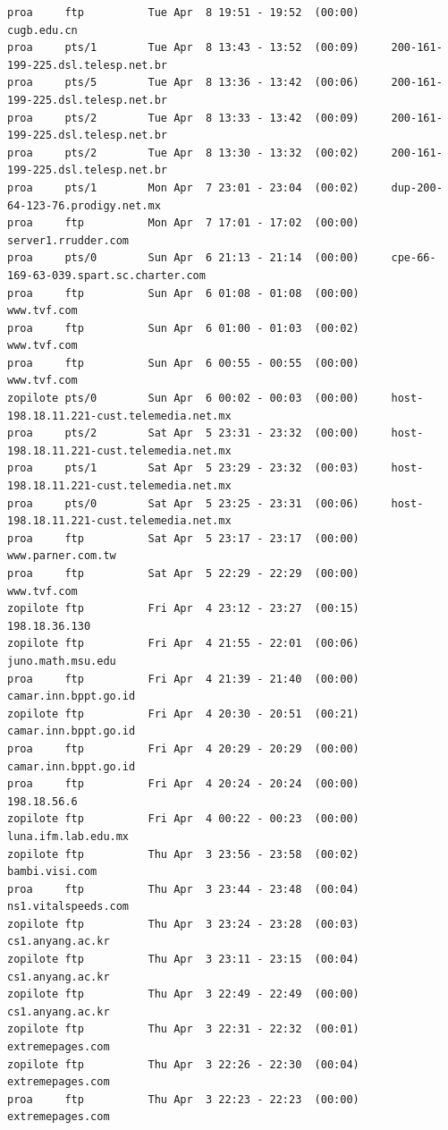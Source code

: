\begin{lstlisting}[style=terminal]
proa     ftp          Tue Apr  8 19:51 - 19:52  (00:00)     cugb.edu.cn
proa     pts/1        Tue Apr  8 13:43 - 13:52  (00:09)     200-161-199-225.dsl.telesp.net.br
proa     pts/5        Tue Apr  8 13:36 - 13:42  (00:06)     200-161-199-225.dsl.telesp.net.br
proa     pts/2        Tue Apr  8 13:33 - 13:42  (00:09)     200-161-199-225.dsl.telesp.net.br
proa     pts/2        Tue Apr  8 13:30 - 13:32  (00:02)     200-161-199-225.dsl.telesp.net.br
proa     pts/1        Mon Apr  7 23:01 - 23:04  (00:02)     dup-200-64-123-76.prodigy.net.mx
proa     ftp          Mon Apr  7 17:01 - 17:02  (00:00)     server1.rrudder.com
proa     pts/0        Sun Apr  6 21:13 - 21:14  (00:00)     cpe-66-169-63-039.spart.sc.charter.com
proa     ftp          Sun Apr  6 01:08 - 01:08  (00:00)     www.tvf.com
proa     ftp          Sun Apr  6 01:00 - 01:03  (00:02)     www.tvf.com
proa     ftp          Sun Apr  6 00:55 - 00:55  (00:00)     www.tvf.com
zopilote pts/0        Sun Apr  6 00:02 - 00:03  (00:00)     host-198.18.11.221-cust.telemedia.net.mx
proa     pts/2        Sat Apr  5 23:31 - 23:32  (00:00)     host-198.18.11.221-cust.telemedia.net.mx
proa     pts/1        Sat Apr  5 23:29 - 23:32  (00:03)     host-198.18.11.221-cust.telemedia.net.mx
proa     pts/0        Sat Apr  5 23:25 - 23:31  (00:06)     host-198.18.11.221-cust.telemedia.net.mx
proa     ftp          Sat Apr  5 23:17 - 23:17  (00:00)     www.parner.com.tw
proa     ftp          Sat Apr  5 22:29 - 22:29  (00:00)     www.tvf.com
zopilote ftp          Fri Apr  4 23:12 - 23:27  (00:15)     198.18.36.130
zopilote ftp          Fri Apr  4 21:55 - 22:01  (00:06)     juno.math.msu.edu
proa     ftp          Fri Apr  4 21:39 - 21:40  (00:00)     camar.inn.bppt.go.id
zopilote ftp          Fri Apr  4 20:30 - 20:51  (00:21)     camar.inn.bppt.go.id
proa     ftp          Fri Apr  4 20:29 - 20:29  (00:00)     camar.inn.bppt.go.id
proa     ftp          Fri Apr  4 20:24 - 20:24  (00:00)     198.18.56.6
zopilote ftp          Fri Apr  4 00:22 - 00:23  (00:00)     luna.ifm.lab.edu.mx
zopilote ftp          Thu Apr  3 23:56 - 23:58  (00:02)     bambi.visi.com
proa     ftp          Thu Apr  3 23:44 - 23:48  (00:04)     ns1.vitalspeeds.com
zopilote ftp          Thu Apr  3 23:24 - 23:28  (00:03)     cs1.anyang.ac.kr
zopilote ftp          Thu Apr  3 23:11 - 23:15  (00:04)     cs1.anyang.ac.kr
zopilote ftp          Thu Apr  3 22:49 - 22:49  (00:00)     cs1.anyang.ac.kr
zopilote ftp          Thu Apr  3 22:31 - 22:32  (00:01)     extremepages.com
zopilote ftp          Thu Apr  3 22:26 - 22:30  (00:04)     extremepages.com
proa     ftp          Thu Apr  3 22:23 - 22:23  (00:00)     extremepages.com

\end{lstlisting}
